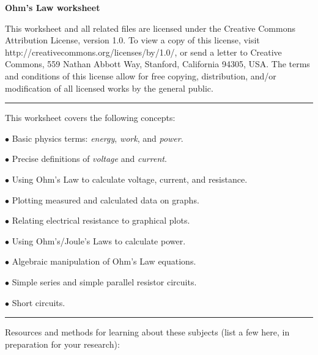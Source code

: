 
\centerline{\bf Ohm's Law worksheet} \bigskip 
 
This worksheet and all related files are licensed under the Creative Commons Attribution License, version 1.0.  To view a copy of this license, visit http://creativecommons.org/licenses/by/1.0/, or send a letter to Creative Commons, 559 Nathan Abbott Way, Stanford, California 94305, USA.  The terms and conditions of this license allow for free copying, distribution, and/or modification of all licensed works by the general public.

\bigskip 

\hrule

\vskip 5pt

This worksheet covers the following concepts:

\bigskip

\item {$\bullet$} Basic physics terms: {\it energy}, {\it work}, and {\it power}.
\item {$\bullet$} Precise definitions of {\it voltage} and {\it current}.
\item {$\bullet$} Using Ohm's Law to calculate voltage, current, and resistance.
\item {$\bullet$} Plotting measured and calculated data on graphs.
\item {$\bullet$} Relating electrical resistance to graphical plots.
\item {$\bullet$} Using Ohm's/Joule's Laws to calculate power.
\item {$\bullet$} Algebraic manipulation of Ohm's Law equations.
\item {$\bullet$} Simple series and simple parallel resistor circuits.
\item {$\bullet$} Short circuits.

\bigskip 

\hrule

\vskip 10pt

Resources and methods for learning about these subjects (list a few here, in preparation for your research):

